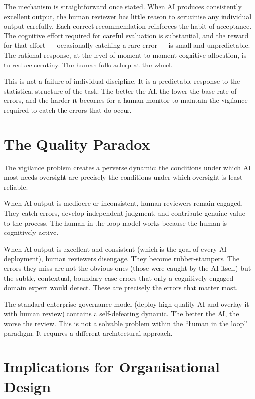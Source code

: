 The mechanism is straightforward once stated. When AI produces consistently excellent output, the human reviewer has little reason to scrutinise any individual output carefully. Each correct recommendation reinforces the habit of acceptance. The cognitive effort required for careful evaluation is substantial, and the reward for that effort --- occasionally catching a rare error --- is small and unpredictable. The rational response, at the level of moment-to-moment cognitive allocation, is to reduce scrutiny. The human falls asleep at the wheel.

This is not a failure of individual discipline. It is a predictable response to the statistical structure of the task. The better the AI, the lower the base rate of errors, and the harder it becomes for a human monitor to maintain the vigilance required to catch the errors that do occur.

\section{The Quality Paradox}

The vigilance problem creates a perverse dynamic: the conditions under which AI most needs oversight are precisely the conditions under which oversight is least reliable.

When AI output is mediocre or inconsistent, human reviewers remain engaged. They catch errors, develop independent judgment, and contribute genuine value to the process. The human-in-the-loop model works because the human is cognitively active.

When AI output is excellent and consistent (which is the goal of every AI deployment), human reviewers disengage. They become rubber-stampers. The errors they miss are not the obvious ones (those were caught by the AI itself) but the subtle, contextual, boundary-case errors that only a cognitively engaged domain expert would detect. These are precisely the errors that matter most.

\begin{keyinsight}
The standard enterprise governance model (deploy high-quality AI and overlay it with human review) contains a self-defeating dynamic. The better the AI, the worse the review. This is not a solvable problem within the ``human in the loop'' paradigm. It requires a different architectural approach.
\end{keyinsight}

\section{Implications for Organisational Design}

